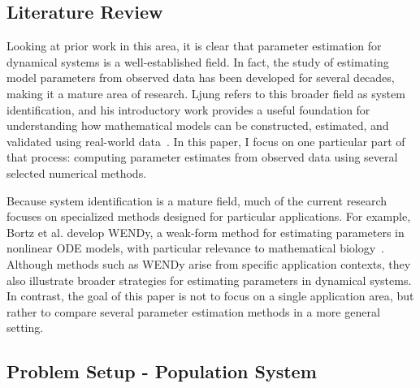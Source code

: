 \documentclass{article}
\begin{document}
\subsection{Literature Review}

Looking at prior work in this area, it is clear that parameter estimation for dynamical systems is a well-established field. In fact, the study of estimating model parameters from observed data has been developed for several decades, making it a mature area of research. Ljung refers to this broader field as system identification, and his introductory work provides a useful foundation for understanding how mathematical models can be constructed, estimated, and validated using real-world data~\cite{ljung1998system}. In this paper, I focus on one particular part of that process: computing parameter estimates from observed data using several selected numerical methods.

Because system identification is a mature field, much of the current research focuses on specialized methods designed for particular applications. For example, Bortz et al. develop WENDy, a weak-form method for estimating parameters in nonlinear ODE models, with particular relevance to mathematical biology~\cite{bortz2023direct}. Although methods such as WENDy arise from specific application contexts, they also illustrate broader strategies for estimating parameters in dynamical systems. In contrast, the goal of this paper is not to focus on a single application area, but rather to compare several parameter estimation methods in a more general setting.

\subsection{Problem Setup - Population System}
\end{document}
